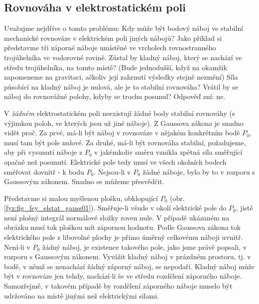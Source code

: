     \subsection{Rovnováha v elektrostatickém poli}
      Uvažujme nejdříve o tomto problému: Kdy může být bodový náboj ve stabilní mechanické rovnováze v 
      elektrickém poli jiných nábojů? Jako příklad si představme tři záporné náboje umístěné ve vrcholech 
      rovnostranného trojúhelníka ve vodorovné rovině. Zůstal by kladný náboj, který se nachází ve středu 
      trojúhelníka, na tomto místě? (Bude jednodušší, když na okamžik zapomeneme na gravitaci, ačkoliv její 
      zahrnutí výsledky stejně nezmění) Síla působící na kladný náboj je nulová, ale je to stabilní 
      rovnováha? Vrátil by se náboj do rovnovážné polohy, kdyby se trochu posunul? Odpověď zní: ne.
      
      V \emph{žádném} elektrostatickém poli neexistují žádné body stabilní rovnováhy (s výjimkou poloh, ve 
      kterých jsou už jiné náboje). Z Gaussova zákona je snadno vidět proč. Za prvé, má-li být náboj v 
      rovnováze v nějakém konkrétním bodě \(P_0\), musí tam být pole nulové. Za druhé, má-li být rovnováha 
      stabilní, požadujeme, aby při vysunutí náboje z \(P_0\) v jakémkoliv směru vznikla zpětná síla 
      směřující opačně než posunutí. Elektrické pole tedy musí ve všech okolních bodech směřovat dovnitř - k 
      bodu \(P_0\). Nejsou-li v \(P_0\) žádné náboje, bylo by to v rozporu s Gaussovým zákonem. Snadno se 
      můžeme přesvědčit.
      
      Představme si malou myšlenou plošku, obklopující \(P_0\) (obr. \ref{fyz:fig_fey_elstat_gauss01}). 
      Směřuje-li všude v okolí elektrické pole do \(P_0\), jistě není plošný integrál normálové složky roven 
      nule. V případě ukázaném na obrázku musí tok ploškou mít zápornou hodnotu. Podle Gaussova zákona tok 
      elektrického pole z libovolné plochy je přímo úměrný celkovému náboji uvnitř. Není-li v \(P_0\) žádný 
      náboj, je existence takového pole, jako jsme právě popsali, v rozporu s Gaussovým zákonem. Vyvážit 
      kladný náboj v prázdném prostoru, tj. v bodě, v němž se nenachází žádný záporný náboj, se nepodaří. 
      Kladný náboj může být v rovnováze jen tehdy, nachází-li še ve středu rozdělení záporného náboje. 
      Samozřejmě, v takovém případě by rozdělení záporného náboje muselo být udržováno na místě jinými než 
      elektrickými silami.
           

